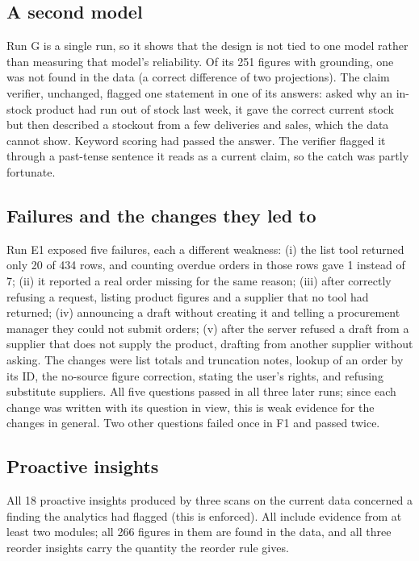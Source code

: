 \documentclass[conference]{IEEEtran}
\begin{document}
\subsection{A second model}

Run G is a single run, so it shows that the design is not tied to one model rather than measuring that model's
reliability. Of its 251 figures with grounding, one was not found in the data (a correct difference of two
projections). The claim verifier, unchanged, flagged one statement in one of its answers: asked why an in-stock
product had run out of stock last week, it gave the correct current stock but then described a stockout from a
few deliveries and sales, which the data cannot show. Keyword scoring had passed the answer. The verifier flagged
it through a past-tense sentence it reads as a current claim, so the catch was partly fortunate.

\subsection{Failures and the changes they led to}
\label{sec:failures}

Run E1 exposed five failures, each a different weakness: (i) the list tool returned only 20 of 434 rows,
and counting overdue orders in those rows gave 1 instead of 7; (ii) it reported a real order missing for the
same reason;
(iii) after correctly refusing a request, listing product figures and a supplier that no tool had returned;
(iv) announcing a draft without creating it and telling a procurement manager they could not submit orders;
(v) after the server refused a draft from a supplier that does not supply the product, drafting from
another supplier without asking. The changes were list totals and truncation notes, lookup of an order by
its ID, the no-source figure correction, stating the user's rights, and refusing substitute suppliers. All
five questions passed in all three later runs; since each change was written with its question in view, this
is weak evidence for the changes in general. Two other questions failed once in F1 and passed twice.

\subsection{Proactive insights}

All 18 proactive insights produced by three scans on the current data concerned a finding the analytics had
flagged (this is enforced). All include evidence from at least two modules; all 266 figures in them are
found in the data, and all three reorder insights carry the quantity the reorder rule gives.
\end{document}

